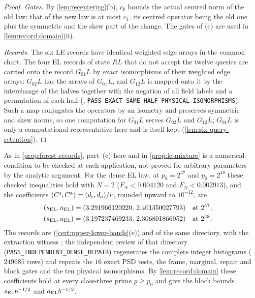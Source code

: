 \begin{proof}
\emph{Gates.} By \cref{lem:recentering}(b), $c_0$ bounds the actual centred norm of
the old law; that of the new law is at most $c_1$, its centred operator being the
old one plus the symmetric and the skew part of the change. The gates of (c) are
used in \cref{lem:record:domain}(ii).

\emph{Records.} The six LE records have identical weighted edge arrays in the
common chart. The four EL records of state $RL$ that do not accept the twelve
queries are carried onto the record $G_{01}L$ by exact isomorphisms of their
weighted edge arrays: $G_{02}L$ has the arrays of $G_{01}L$, and $G_{12}L$ is mapped
onto it by the interchange of the halves together with the negation of all field
labels and a permutation of each half
(,
\texttt{PASS\_\allowbreak EXACT\_\allowbreak SAME\_\allowbreak HALF\_\allowbreak PHYSICAL\_\allowbreak ISOMORPHISMS}). Such a map conjugates the
operators by an isometry and preserves symmetric and skew norms, so one computation
for $G_{01}L$ serves $G_{02}L$ and $G_{12}L$; $G_{01}L$ is only a
computational representative here and is itself kept
(\cref{lem:six-query-retention}).
\end{proof}

As in \cref{prop:forest-records}, part~(c) here and in
\cref{prop:le-mixture} is a numerical condition to be checked at
each application, not proved for arbitrary parameters by the
analytic argument. For the dense EL law, at $p_0=2^{47}$ and
$p_0=2^{48}$ these checked inequalities hold with $N=2$
($F_N<0.004120$ and $F_N<0.002913$), and the coefficients
$(C^{\rm s},C^{\rm a})=(d_{\rm s},d_{\rm a})/r$, rounded upward to $10^{-12}$, are
\begin{align*}
 (s_{\rm EL},a_{\rm EL})&=(3.291966120220,\,2.401350027793)&&\text{at }2^{47},\\
 (s_{\rm EL},a_{\rm EL})&=(3.197237469233,\,2.306801866952)&&\text{at }2^{48}.
\end{align*}
The records are 
(\cref{cert:upper-lower-bands}(e)) and 
of the same directory, with the extraction witness ;
the independent review  of that directory
(\texttt{PASS\_\allowbreak INDEPENDENT\_\allowbreak DENSE\_\allowbreak REPAIR}) regenerates the complete integer
histograms ($249685$ rows) and repeats the $16$ exact PSD tests, the frame,
marginal, repair and block gates and the ten physical isomorphisms. By
\cref{lem:record:domain} these coefficients hold at every class-three prime
$p\ge p_0$ and give the block bounds $s_{\rm EL}b^{-1/2}$ and $a_{\rm EL}b^{-1/2}$.


